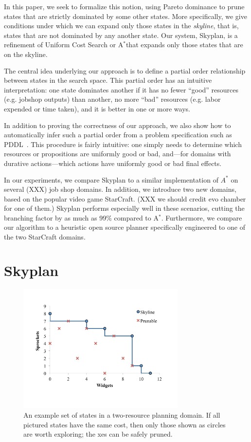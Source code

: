 \documentclass[letterpaper]{article}
\theoremstyle{plain} \newtheorem{theorem}{Theorem} \newtheorem{proposition}{Proposition} \newtheorem{lemma}{Lemma}
\theoremstyle{definition} \newtheorem{definition}{Definition} \newtheorem{conjecture}{Conjecture} \newtheorem*{example}{Example}
\theoremstyle{remark} \newtheorem*{remark}{Remark} \newtheorem*{note}{Note} \newtheorem{case}{Case}
\newcommand{\Astar}{A$^*$}
\begin{document}
In this paper, we seek to formalize this notion, using Pareto
dominance to prune states that are strictly dominated by some other
states. More specifically, we give conditions under which we can
expand only those states in the \textit{skyline}, that is, states
that are not dominated by any another state. Our system, Skyplan,
is a refinement of Uniform Cost Search or \Astar that expands only
those states that are on the skyline.

The central idea underlying our approach is to define a partial
order relationship between states in the search space. This partial
order has an intuitive interpretation: one state dominates another
if it has no fewer ``good'' resources (e.g. jobshop outputs) than
another, no more ``bad'' resources (e.g. labor expended or time
taken), and it is better in one or more ways. 

In addition to proving the correctness of our approach, we also
show how to automatically infer such a partial order from a problem
specification such as PDDL~\citep{ghallab1998pddl,fox2003pddl2}.
This procedure is fairly intuitive: one simply needs to determine
which resources or propositions are uniformly good or bad, and---for 
domains with durative actions---which actions have uniformly
good or bad final effects.

In our experiments, we compare Skyplan to a similar implementation
of $A^*$ on several (XXX) job shop domains. In addition, we introduce
two new domains, based on the popular video game StarCraft. (XXX
we should credit evo chamber for one of them.) Skyplan performs
especially well in these scenarios, cutting the branching factor
by as much as 99\% compared to \Astar.  Furthermore, we compare our
algorithm to a heuristic open source planner specifically engineered
to one of the two StarCraft domains.

\section{Skyplan}

\begin{figure}
	\begin{center}
	\includegraphics[width=3.3in]{skyline2d.pdf}
\end{center}
  \caption{An example set of states in a two-resource planning domain. If
all pictured states have the same cost, then only those shown as circles are
worth exploring; the xes can be safely pruned.}
\end{figure}
\end{document}
